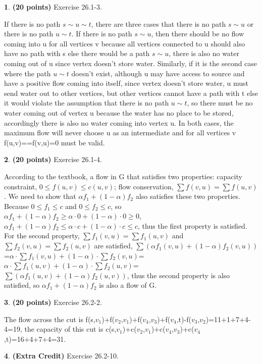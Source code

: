 \documentclass[11pt]{article}
\theoremstyle{definition}
\theoremstyle{theorem}
\newtheorem{prob}{}
\newcommand{\solution}{\medskip\noindent{\color{DarkBlue}\textbf{Solution:}}}
\begin{document}
\begin{prob} \textbf{(20 points)} Exercise 26.1-3.
\end{prob}
\solution
If there is no path $s\sim u\sim t$, there are three cases that there is no path $s\sim u$ or there is no path $u\sim t$. If there is no path $s\sim u$, then there should be no flow coming into u for all vertices v because all vertices connected to u should also have no path with s else there would be a path $s\sim u$, there is also no water coming out of u since vertex doesn't store water. Similarly, if it is the second case where the path $u\sim t$ doesn't exist, although u may have access to source and have a positive flow coming into itself, since vertex doesn't store water, u must send water out to other vertices, but other vertices cannot have a path with t else it would violate the assumption that there is no path $u\sim t$, so there must be no water coming out of vertex u because the water has no place to be stored, accordingly there is also no water coming into vertex u. In both cases, the maximum flow will never choose u as an intermediate and for all vertices v f(u,v)==f(v,u)=0 must be valid.
\begin{prob} \textbf{(20 points)} Exercise 26.1-4.
\end{prob}
\solution
According to the textbook, a flow in G that satisfies two properties: capacity constraint, $0\leq f(u, v)\leq c(u, v)$; flow conservation, $\sum f(v,u)=\sum f(u,v)$. We need to show that $\alpha f_1+(1-\alpha)f_2$ also satisfies these two properties. Because $0\leq f_1\leq c$ and $0\leq f_2\leq c$, so $\alpha f_1+(1-\alpha)f_2\geq \alpha \cdot 0+(1-\alpha)\cdot 0 \geq 0$, $\alpha f_1+(1-\alpha)f_2\leq \alpha \cdot c+(1-\alpha)\cdot c \leq c$, thus the first property is satisfied. For the second property, $\sum f_1(v,u)=\sum f_1(u,v)$ and $\sum f_2(v,u)=\sum f_2(u,v)$ are satisfied, $\sum(\alpha f_1(v,u)+(1-\alpha)f_2(v,u))$=$\alpha\cdot\sum f_1(v,u)+(1-\alpha)\cdot\sum f_2(v,u)$=$\alpha\cdot\sum f_1(u,v)+(1-\alpha)\cdot\sum f_2(u,v)$=$\sum(\alpha f_1(u,v)+(1-\alpha)f_2(u,v))$, thus the second property is also satisfied, so $\alpha f_1+(1-\alpha)f_2$ is also a flow of G.
\begin{prob} \textbf{(20 points)} Exercise 26.2-2.
\end{prob}
\solution
The flow across the cut is f(s,$v_1$)+f($v_2$,$v_1$)+f($v_4$,$v_3$)+f($v_4$,t)-f($v_3$,$v_2$)=11+1+7+4-4=19, the capacity of this cut is  c(s,$v_1$)+c($v_2$,$v_1$)+c($v_4$,$v_3$)+c($v_4$,t)=16+4+7+4=31.
\begin{prob} \textbf{(Extra Credit)} Exercise 26.2-10.
\end{prob}
\solution
\end{document}
